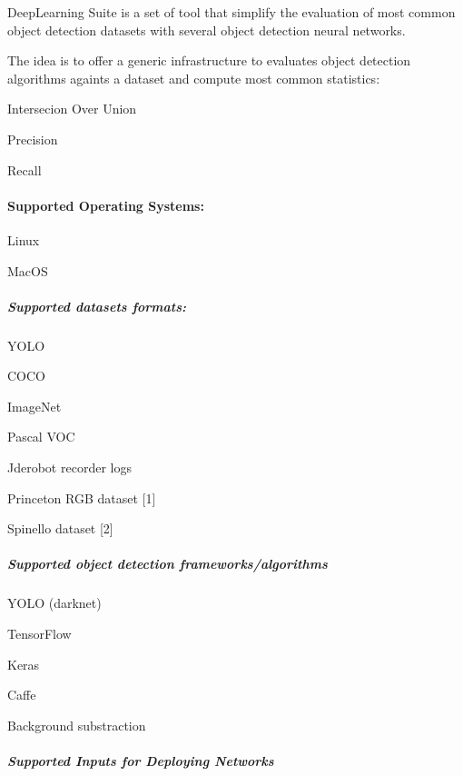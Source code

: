 \href{https://travis-ci.org/JdeRobot/dl-DetectionSuite}{\tt }

Deep\+Learning Suite is a set of tool that simplify the evaluation of most common object detection datasets with several object detection neural networks.

The idea is to offer a generic infrastructure to evaluates object detection algorithms againts a dataset and compute most common statistics\+:
\begin{DoxyItemize}
\item Intersecion Over Union
\item Precision
\item Recall
\end{DoxyItemize}

\paragraph*{Supported Operating Systems\+:}


\begin{DoxyItemize}
\item Linux
\item Mac\+OS
\end{DoxyItemize}

\subparagraph*{Supported datasets formats\+:}


\begin{DoxyItemize}
\item Y\+O\+LO
\item C\+O\+CO
\item Image\+Net
\item Pascal V\+OC
\item Jderobot recorder logs
\item Princeton R\+GB dataset \mbox{[}1\mbox{]}
\item Spinello dataset \mbox{[}2\mbox{]}
\end{DoxyItemize}

\subparagraph*{Supported object detection frameworks/algorithms}


\begin{DoxyItemize}
\item Y\+O\+LO (darknet)
\item Tensor\+Flow
\item Keras
\item Caffe
\item Background substraction
\end{DoxyItemize}

\subparagraph*{Supported Inputs for Deploying Networks}


